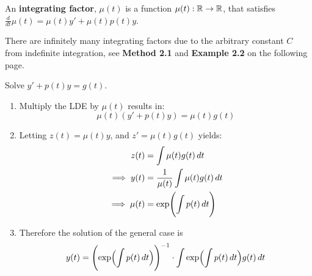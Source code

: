 \documentclass[twoside]{report}
\begin{document}
    \begin{definition}
        An \textbf{integrating factor}, $\mu(t)$ is a function $\mu(t): \mathbb{R} \to \mathbb{R}$, that satisfies $\frac{d}{dt}\mu(t) = \mu(t)y'+\mu(t)p(t)y$.
    \end{definition}
    \begin{remark}
        There are infinitely many integrating factors due to the arbitrary constant $C$ from indefinite integration, see \textbf{Method 2.1} and \textbf{Example 2.2} on the following page.
    \end{remark}
    \np
    \begin{method}
        Solve $y' + p(t)y = g(t)$.
        \begin{enumerate}
            \item Multiply the LDE by $\mu(t)$ results in:
                \begin{equation}
                    \mu(t)(y' + p(t)y) = \mu(t)g(t)
                \end{equation}
            \item Letting $z(t) = \mu(t)y$, and $z' = \mu(t)g(t)$ yields:
                \begin{align}
                    z(t) &= \int \mu(t)g(t)\,dt\\
                    \implies y(t) &= \frac{1}{\mu(t)}\int \mu(t)g(t)\,dt\\
                    \implies \mu(t) &= \exp\BBp{\int p(t)\,dt}
                \end{align}
            \item Therefore the solution of the general case is
                \begin{equation}
                    y(t) = \BBp{\exp\Bp{\int p(t)\,dt}}^{-1}\cdot \int \exp\Bp{\int p(t)\,dt}g(t)\,dt
                \end{equation}
        \end{enumerate}
    \end{method}
\end{document}
